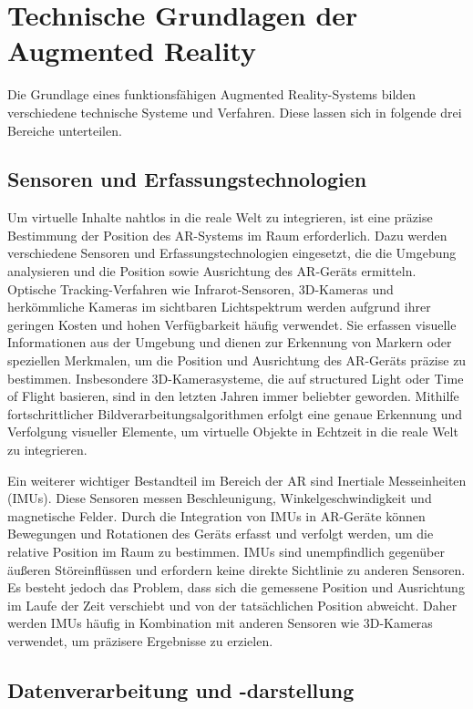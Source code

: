\section{Technische Grundlagen der Augmented Reality}
Die Grundlage eines funktionsfähigen Augmented Reality-Systems bilden
verschiedene technische Systeme und Verfahren. Diese lassen sich in folgende
drei Bereiche unterteilen.

\subsection{Sensoren und Erfassungstechnologien}

Um virtuelle Inhalte nahtlos in die reale Welt zu integrieren, ist eine präzise
Bestimmung der Position des AR-Systems im Raum erforderlich. Dazu werden
verschiedene Sensoren und Erfassungstechnologien eingesetzt, die die Umgebung
analysieren und die Position sowie Ausrichtung des AR-Geräts ermitteln.
Optische Tracking-Verfahren wie Infrarot-Sensoren, 3D-Kameras und herkömmliche
Kameras im sichtbaren Lichtspektrum werden aufgrund ihrer geringen Kosten und
hohen Verfügbarkeit häufig verwendet. Sie erfassen visuelle Informationen aus
der Umgebung und dienen zur Erkennung von Markern oder speziellen Merkmalen, um
die Position und Ausrichtung des AR-Geräts präzise zu bestimmen. Insbesondere
3D-Kamerasysteme, die auf structured Light oder Time of Flight basieren, sind
in den letzten Jahren immer beliebter geworden. Mithilfe fortschrittlicher
Bildverarbeitungsalgorithmen erfolgt eine genaue Erkennung und Verfolgung
visueller Elemente, um virtuelle Objekte in Echtzeit in die reale Welt zu
integrieren.

Ein weiterer wichtiger Bestandteil im Bereich der AR sind Inertiale
Messeinheiten (IMUs). Diese Sensoren messen Beschleunigung,
Winkelgeschwindigkeit und magnetische Felder. Durch die Integration von IMUs in
AR-Geräte können Bewegungen und Rotationen des Geräts erfasst und verfolgt
werden, um die relative Position im Raum zu bestimmen. IMUs sind unempfindlich
gegenüber äußeren Störeinflüssen und erfordern keine direkte Sichtlinie zu
anderen Sensoren. Es besteht jedoch das Problem, dass sich die gemessene
Position und Ausrichtung im Laufe der Zeit verschiebt und von der tatsächlichen
Position abweicht. Daher werden IMUs häufig in Kombination mit anderen Sensoren
wie 3D-Kameras verwendet, um präzisere Ergebnisse zu erzielen.

\subsection{Datenverarbeitung und -darstellung}


